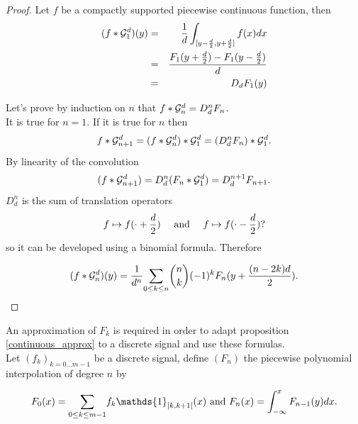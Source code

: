 \begin{proof}
Let $f$ be a compactly supported piecewise continuous function, then
\begin{eqnarray*}
(f * \mathcal{G}_1^d )(y)&=&\frac{1}{d} \int_{[y-\frac{d}{2},y+\frac{d}{2}]} f(x) dx\\
               &=&\frac{F_{1}(y+\frac{d}{2})-F_{1}(y-\frac{d}{2})}{d}\\
               &=&D_d F_{1}(y)
\end{eqnarray*}


\noindent Let's prove by induction on $n$ that $ f*\mathcal{G}_n^d=D_d^n F_{n}$.\\
It is true for $n=1$. If it is true for $n$ then
\begin{equation*}
f*\mathcal{G}_{n+1}^{d}=(f * \mathcal{G}_{n}^d) * \mathcal{G}_{1}^{d}= (D_d^n F_{n})*\mathcal{G}_1^d.
\end{equation*}
By linearity of the convolution
\begin{equation*}
(f*\mathcal{G}_{n+1}^{d}) = D_d^n (F_{n}*\mathcal{G}_1^d) = D_d^{n+1} F_{n+1}.
\end{equation*}
$D_d^n$ is the sum of translation operators
\begin{equation*}
f\mapsto f(\cdot+\frac{d}{2})~~~\textrm{ and }~~~f\mapsto f(\cdot-\frac{d}{2})?
\end{equation*}
so it can be developed using a binomial formula. Therefore

\begin{equation*}
(f*\mathcal{G}_n^d)(y) = \frac{1}{d^n}\underset{0 \le k\le n}{\sum} \binom{n}{k}(-1)^{k} F_{n}(y+\frac{(n-2k)d}{2}).
\end{equation*}
\end{proof}



An approximation of $F_{k}$ is required in order to adapt proposition \ref{continuous_approx} to a discrete signal and use these formulas.\\
\medbreak
Let $(f_k)_{k=0...m-1}$ be a discrete signal, define $(F_n)$ the piecewise polynomial interpolation of degree $n$ by

\begin{equation}
F_{0} (x) =\underset{0\le k \le m-1}{\sum}f_{k} \mathds{1}_{[k,k+1[}(x) \txt{ and }  F_{n}(x)=\int_{-\infty}^{x}F_{n-1}(y)dx.
\label{defintion_fn}
\end{equation}

